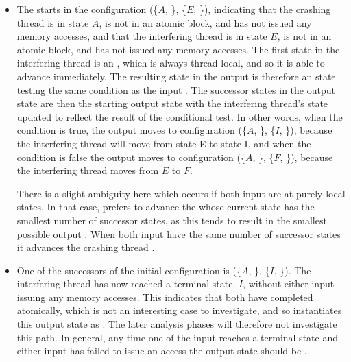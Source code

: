 \begin{itemize}
\item The {\StateMachine} starts in the configuration (\{$A$,
  {\false}\}, \{$E$, {\false}\}), indicating that the crashing thread
  {\StateMachine} is in state $A$, is not in an atomic block, and has
  not issued any memory accesses, and that the interfering thread
  {\StateMachine} is in state $E$, is not in an atomic block, and has
  not issued any memory accesses.  The first state in the interfering
  thread is an , which is always thread-local, and so it is
  able to advance immediately.  The resulting state in the output
  {\StateMachine} is therefore an  state testing the same
  condition as the input .  The successor states in the
  output state are then the starting output state with the interfering
  thread's state updated to reflect the result of the conditional
  test.  In other words, when the condition is true, the output
  {\StateMachine} moves to configuration (\{$A$, {\false}\}, \{$I$,
  {\false}\}), because the interfering thread {\StateMachine} will
  move from state E to state I, and when the condition is false the
  output {\StateMachine} moves to configuration (\{$A$, {\false}\},
  \{$F$, {\false}\}), because the interfering thread {\StateMachine}
  moves from $E$ to $F$.

  There is a slight ambiguity here which occurs if both input
  {\StateMachines} are at purely local states.  In that case,
  {\technique} prefers to advance the {\StateMachine} whose current
  state has the smallest number of successor states, as this tends to
  result in the smallest possible output {\StateMachine}.  When both
  input {\StateMachines} have the same number of successor states it
  advances the crashing thread {\StateMachine}.

\item One of the successors of the initial configuration is (\{$A$,
  {\false}\}, \{$I$, {\false}\}).  The interfering thread
  {\StateMachine} has now reached a terminal state, $I$, without
  either input {\StateMachine} issuing any memory accesses.  This
  indicates that both {\StateMachines} have completed atomically,
  which is not an interesting case to investigate, and so {\technique}
  instantiates this output state as {\stUnreached}.  The later
  analysis phases will therefore not investigate this path.  In
  general, any time one of the input {\StateMachines} reaches a
  terminal state and either input {\StateMachine} has failed to issue
  an access the output state should be {\stUnreached}.


\end{itemize}
